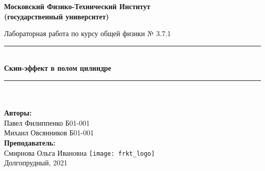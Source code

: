 \newcommand{\HRule}{\rule{\linewidth}{0.7mm}} %

\begin{center}
\large\textbf{Московский Физико-Технический Институт}\\ %
\large\textbf{(государственный университет)}

\vfill

\Large Лабораторная работа по курсу общей физики № 3.7.1\\[0.5cm] %


\HRule
\\[0.4cm]
{ \huge \bfseries Скин-эффект в полом цилиндре}%
\\[0.4cm]
\HRule
\\[0.5cm]

\ \\
\textbf{\large Авторы:} \\
\large Павел Филиппенко Б01-001\\ %
\large Михаил Овсянников Б01-001\\ %
\vspace*{2cm}
\textbf{\large Преподаватель:}\\
\large Смирнова Ольга Ивановна
\vfill
\hspace*{-0.8 cm}\texttt{[image: frkt\_logo]}\\ %
\large Долгопрудный, 2021 %
\thispagestyle{empty}
\end{center}

\newpage
\setcounter{page}{2}
\fancyfoot[c]{\thepage}
\fancyhead[R]{}